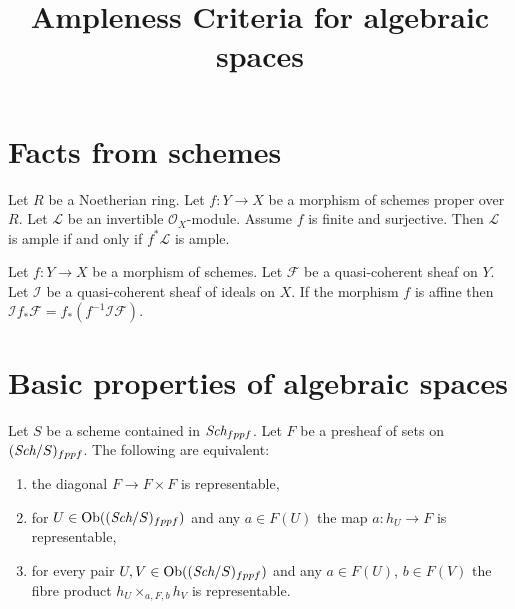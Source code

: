


\newcommand{\todo}[1]{\footnote{\textbf{TODO.} #1}}

\title{Ampleness Criteria for algebraic spaces}
\maketitle

\section{Facts from schemes}
\begin{lemma}
\label{cohomology-schemes-lemma-surjective-finite-morphism-ample}
Let $R$ be a Noetherian ring. Let $f : Y \to X$ be a morphism of
schemes proper over $R$. Let $\mathcal{L}$ be an
invertible $\mathcal{O}_X$-module. Assume $f$ is finite and surjective.
Then $\mathcal{L}$ is ample if and only if $f^*\mathcal{L}$ is ample.
\end{lemma}

\begin{lemma}
\label{coherent-lemma-affine-morphism-projection-ideal}
Let $f : Y \to X$ be a morphism of schemes.
Let $\mathcal{F}$ be a quasi-coherent sheaf on $Y$.
Let $\mathcal{I}$ be a quasi-coherent sheaf of ideals on $X$.
If the morphism $f$ is affine then
$\mathcal{I}f_*\mathcal{F} = f_*(f^{-1}\mathcal{I}\mathcal{F})$.
\end{lemma}

\section{Basic properties of algebraic spaces}

\begin{lemma}
\label{lemma-representable-diagonal}
Let $S$ be a scheme contained in $\textit{Sch}_{fppf}$.
Let $F$ be a presheaf of sets on $(\textit{Sch}/S)_{fppf}$.
The following are equivalent:
\begin{enumerate}
\item the diagonal $F \to F \times F$ is representable,
\item for $U \in \mathop{\rm Ob}\nolimits((\textit{Sch}/S)_{fppf})$ and any $a \in F(U)$
the map $a : h_U \to F$ is representable,
\item for every pair $U, V \in \mathop{\rm Ob}\nolimits((\textit{Sch}/S)_{fppf})$
and any $a \in F(U)$, $b \in F(V)$ the fibre product
$h_U \times_{a, F, b} h_V$ is representable.
\end{enumerate}
\end{lemma}

